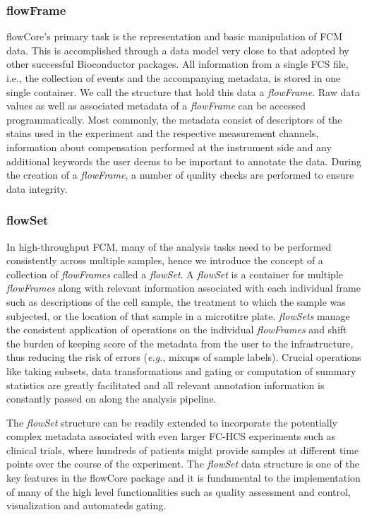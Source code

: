 \documentclass[10pt]{bmc_article}
\newcommand{\Rpackage}[1]{{\textsf{#1}}}
\newcommand{\Rclass}[1]{{\textit{#1}}}
\newenvironment{bmcformat}{\begin{raggedright}\baselineskip20pt\sloppy\setboolean{publ}{false}}{\end{raggedright}\baselineskip20pt\sloppy}
\begin{document}
\begin{bmcformat}
\subsubsection*{flowFrame}
\Rpackage{flowCore}'s primary task is the representation and basic
manipulation of FCM data. This is accomplished through a data model
very close to that adopted by other successful Bioconductor
packages. All information from a single FCS file, i.e., the collection
of events and the accompanying metadata, is stored in one single
container. We call the structure that hold this data a
\Rclass{flowFrame}. Raw data values as well as associated metadata of
a \Rclass{flowFrame} can be accessed programmatically. Most commonly,
the metadata consist of descriptors of the stains used in the
experiment and the respective measurement channels, information about
compensation performed at the instrument side and any additional
keywords the user deems to be important to annotate the data. During
the creation of a \Rclass{flowFrame}, a number of quality checks are
performed to ensure data integrity.

\subsubsection*{flowSet}
In high-throughput FCM, many of the analysis tasks need to be
performed consistently across multiple samples, hence we introduce the
concept of a collection of \Rclass{flowFrames} called a
\Rclass{flowSet}. A \Rclass{flowSet} is a container for multiple
\Rclass{flowFrames} along with relevant information associated with
each individual frame such as descriptions of the cell sample, the
treatment to which the sample was subjected, or the location of that
sample in a microtitre plate.  \Rclass{flowSets} manage the consistent
application of operations on the individual \Rclass{flowFrames} and
shift the burden of keeping score of the metadata from the user to the
infrastructure, thus reducing the risk of errors (\textit{e.g.},
mixups of sample labels). Crucial operations like taking subsets, data
transformations and gating or computation of summary statistics are
greatly facilitated and all relevant annotation information is
constantly passed on along the analysis pipeline. 

The \Rclass{flowSet} structure can be readily extended to incorporate
the potentially complex metadata associated with even larger FC-HCS
experiments such as clinical trials, where hundreds of patients might
provide samples at different time points over the course of the
experiment. The \Rclass{flowSet} data structure is one of the key
features in the \Rpackage{flowCore} package and it is fundamental to
the implementation of many of the high level functionalities such as
quality assessment and control, visualization and automateds gating.


\end{bmcformat}
\end{document}
